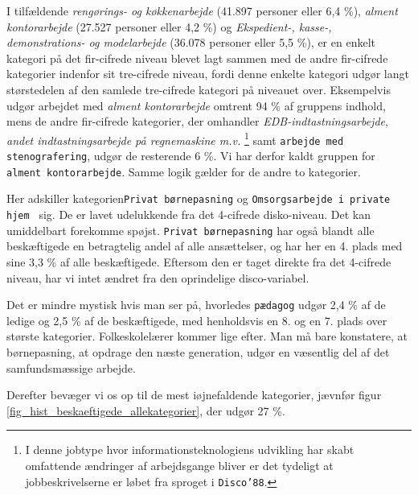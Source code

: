 
I tilfældende  \emph{rengørings- og køkkenarbejde} (41.897 personer eller 6,4 \%), \emph{alment kontorarbejde} (27.527 personer eller 4,2 \%) og \emph{Ekspedient-, kasse-,  demonstrations- og modelarbejde} (36.078 personer eller 5,5 \%), er en enkelt kategori på det fir-cifrede niveau blevet lagt sammen med de andre fir-cifrede kategorier indenfor sit tre-cifrede niveau, fordi denne enkelte kategori udgør langt størstedelen af den samlede tre-cifrede kategori på niveauet over. Eksempelvis udgør arbejdet med \emph{alment kontorarbejde} omtrent 94 \% af gruppens indhold, mens de andre fir-cifrede kategorier, der omhandler \emph{EDB-indtastningsarbejde}, \emph{andet indtastningsarbejde på regnemaskine m.v.}%
%
\footnote{I denne jobtype hvor informationsteknologiens udvikling har skabt omfattende ændringer af arbejdsgange bliver er det tydeligt at jobbeskrivelserne er løbet fra sproget i \texttt{Disco'88}.}%
%
samt \texttt{arbejde med stenografering}, udgør de resterende 6 \%. Vi har derfor kaldt gruppen for \texttt{alment kontorarbejde}. Samme logik gælder for de andre to kategorier.

Her adskiller kategorien\texttt{Privat børnepasning} og \texttt{Omsorgsarbejde i private hjem
} sig. De er lavet udelukkende fra det 4-cifrede disko-niveau. Det kan umiddelbart forekomme spøjst. \texttt{Privat børnepasning} har også blandt alle beskæftigede en betragtelig andel af alle ansættelser, og har her en 4. plads med sine 3,3 \% af alle beskæftigede. Eftersom den er taget direkte fra det 4-cifrede niveau, har vi intet ændret fra den oprindelige disco-variabel.

Det er mindre mystisk hvis man ser på, hvorledes \texttt{pædagog} udgør 2,4 \% af de ledige og 2,5 \% af de beskæftigede, med henholdsvis en 8. og en 7. plads over største kategorier. Folkeskolelærer kommer lige efter. Man må bare konstatere, at børnepasning, at opdrage den næste generation, udgør en væsentlig del af det samfundsmæssige arbejde. %

Derefter bevæger vi os op til de mest iøjnefaldende kategorier, jævnfør figur \ref{fig_hist_beskaeftigede_allekategorier}, der udgør 27 \%.

